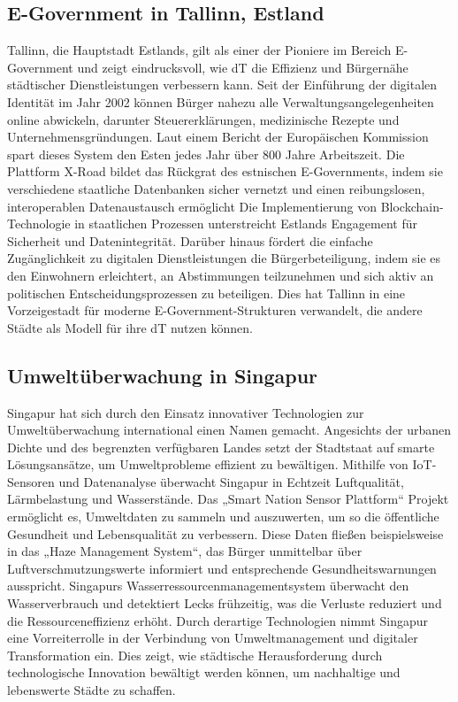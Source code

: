\documentclass[conference,compsoc,final,a4paper, onecolumn, 11pt]{IEEEtran}
\begin{document}
\subsection{E-Government in Tallinn, Estland}
Tallinn, die Hauptstadt Estlands, gilt als einer der Pioniere im Bereich E-Government und zeigt eindrucksvoll, wie \ac{dT} die Effizienz und Bürgernähe städtischer Dienstleistungen verbessern kann. 
Seit der Einführung der digitalen Identität im Jahr 2002 können Bürger nahezu alle Verwaltungsangelegenheiten online abwickeln, darunter Steuererklärungen, medizinische Rezepte und Unternehmensgründungen. 
Laut einem Bericht der Europäischen Kommission spart dieses System den Esten jedes Jahr über 800 Jahre Arbeitszeit. \autocite{noauthor_estonia_2021}
Die Plattform X-Road bildet das Rückgrat des estnischen E-Governments, indem sie verschiedene staatliche Datenbanken sicher vernetzt und einen reibungslosen, interoperablen Datenaustausch ermöglicht \autocite{noauthor_estonia_nodate}
Die Implementierung von Blockchain-Technologie in staatlichen Prozessen unterstreicht Estlands Engagement für Sicherheit und Datenintegrität. \autocite{noauthor_estonia_2021}
Darüber hinaus fördert die einfache Zugänglichkeit zu digitalen Dienstleistungen die Bürgerbeteiligung, indem sie es den Einwohnern erleichtert, an Abstimmungen teilzunehmen und sich aktiv an politischen Entscheidungsprozessen zu beteiligen. 
Dies hat Tallinn in eine Vorzeigestadt für moderne E-Government-Strukturen verwandelt, die andere Städte als Modell für ihre \ac{dT} nutzen können.


\subsection{Umweltüberwachung in Singapur}
Singapur hat sich durch den Einsatz innovativer Technologien zur Umweltüberwachung international einen Namen gemacht. 
Angesichts der urbanen Dichte und des begrenzten verfügbaren Landes setzt der Stadtstaat auf smarte Lösungsansätze, um Umweltprobleme effizient zu bewältigen. 
Mithilfe von \ac{IoT}-Sensoren und Datenanalyse überwacht Singapur in Echtzeit Luftqualität, Lärmbelastung und Wasserstände. \autocite{noauthor_smart_nodate-1}
Das „Smart Nation Sensor Plattform“ Projekt ermöglicht es, Umweltdaten zu sammeln und auszuwerten, um so die öffentliche Gesundheit und Lebensqualität zu verbessern. 
Diese Daten fließen beispielsweise in das „Haze Management System“, das Bürger unmittelbar über Luftverschmutzungswerte informiert und entsprechende Gesundheitswarnungen ausspricht. \autocite{noauthor_smart_nodate-1}
Singapurs Wasserressourcenmanagementsystem überwacht den Wasserverbrauch und detektiert Lecks frühzeitig, was die Verluste reduziert und die Ressourceneffizienz erhöht. \autocite{noauthor_smart_nodate-1}
Durch derartige Technologien nimmt Singapur eine Vorreiterrolle in der Verbindung von Umweltmanagement und digitaler Transformation ein. 
Dies zeigt, wie städtische Herausforderung durch technologische Innovation bewältigt werden können, um nachhaltige und lebenswerte Städte zu schaffen.
\end{document}
